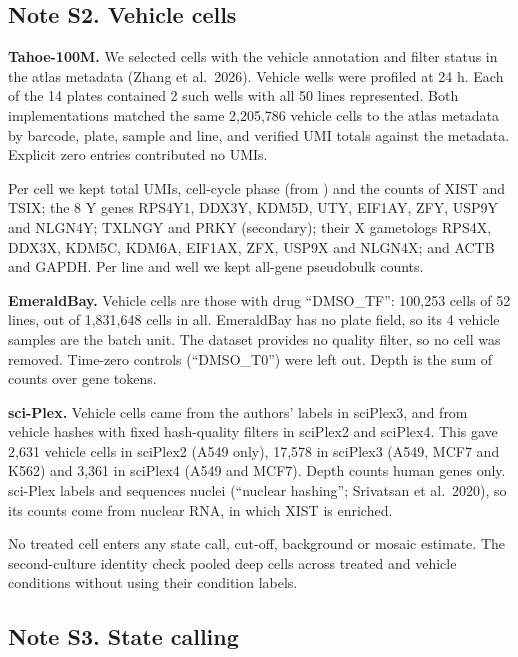 \documentclass[
  11pt,
  letterpaper,
]{article}
\begin{document}
\subsection{Note S2. Vehicle cells}\label{note-s2.-vehicle-cells}

\textbf{Tahoe-100M.} We selected cells with the  vehicle
annotation and  filter status in the atlas metadata (Zhang et
al.~2026). Vehicle wells were profiled at 24 h. Each of the 14 plates
contained 2 such wells with all 50 lines represented. Both
implementations matched the same 2,205,786 vehicle cells to the atlas
metadata by barcode, plate, sample and line, and verified UMI totals
against the metadata. Explicit zero entries contributed no UMIs.

Per cell we kept total UMIs, cell-cycle phase (from )
and the counts of XIST and TSIX; the 8 Y genes RPS4Y1, DDX3Y, KDM5D,
UTY, EIF1AY, ZFY, USP9Y and NLGN4Y; TXLNGY and PRKY (secondary); their X
gametologs RPS4X, DDX3X, KDM5C, KDM6A, EIF1AX, ZFX, USP9X and NLGN4X;
and ACTB and GAPDH. Per line and well we kept all-gene pseudobulk
counts.

\textbf{EmeraldBay.} Vehicle cells are those with drug ``DMSO\_TF'':
100,253 cells of 52 lines, out of 1,831,648 cells in all. EmeraldBay has
no plate field, so its 4 vehicle samples are the batch unit. The dataset
provides no quality filter, so no cell was removed. Time-zero controls
(``DMSO\_T0'') were left out. Depth is the sum of counts over gene
tokens.

\textbf{sci-Plex.} Vehicle cells came from the authors' labels in
sciPlex3, and from vehicle hashes with fixed hash-quality filters in
sciPlex2 and sciPlex4. This gave 2,631 vehicle cells in sciPlex2 (A549
only), 17,578 in sciPlex3 (A549, MCF7 and K562) and 3,361 in sciPlex4
(A549 and MCF7). Depth counts human genes only. sci-Plex labels and
sequences nuclei (``nuclear hashing''; Srivatsan et al.~2020), so its
counts come from nuclear RNA, in which XIST is enriched.

No treated cell enters any state call, cut-off, background or mosaic
estimate. The second-culture identity check pooled deep cells across
treated and vehicle conditions without using their condition labels.

\subsection{Note S3. State calling}\label{note-s3.-state-calling}
\end{document}
